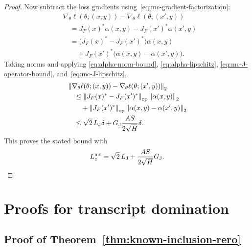 \documentclass[conference,compsoc]{IEEEtran}
\newcommand{\op}{\mathrm{op}}
\newcommand{\norm}[1]{\left\lVert #1\right\rVert}
\begin{document}
\begin{proof}
Now subtract the loss gradients using~\eqref{eq:mc-gradient-factorization}:
\begin{align*}
&\nabla_\theta\ell(\theta;(x,y))
-
\nabla_\theta\ell(\theta;(x',y))\\
&\quad=
J_F(x)^\ast\alpha(x,y)-J_F(x')^\ast\alpha(x',y)\\
&\quad=
\bigl(J_F(x)^\ast-J_F(x')^\ast\bigr)\alpha(x,y)\\
&\qquad+
J_F(x')^\ast\bigl(\alpha(x,y)-\alpha(x',y)\bigr).
\end{align*}
Taking norms and applying
\eqref{eq:alpha-norm-bound}, \eqref{eq:alpha-lipschitz},
\eqref{eq:mc-J-operator-bound}, and~\eqref{eq:mc-J-lipschitz},
\begin{align*}
&\norm{\nabla_\theta\ell(\theta;(x,y))
-
\nabla_\theta\ell(\theta;(x',y))}_2\\
&\quad\le
\norm{J_F(x)^\ast-J_F(x')^\ast}_{\op}
\norm{\alpha(x,y)}_2\\
&\qquad+
\norm{J_F(x')^\ast}_{\op}
\norm{\alpha(x,y)-\alpha(x',y)}_2\\
&\quad\le
\sqrt2\,L_{\rm J}\delta
+G_{\rm J}\frac{AS}{2\sqrt H}\delta.
\end{align*}
This proves the stated bound with
\[
L_z^{\rm mc}=\sqrt2\,L_{\rm J}+\frac{AS}{2\sqrt H}G_{\rm J}.
\]
\end{proof}

\section{Proofs for transcript domination}
\label{app:transcript-proofs}

\subsection{Proof of Theorem~\ref{thm:known-inclusion-rero}}
\end{document}
